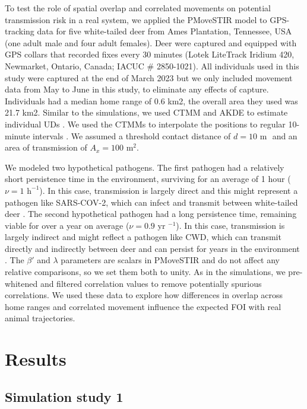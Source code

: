 ﻿\documentclass[11pt]{article}
\begin{document}
To test the role of spatial overlap and correlated movements on potential transmission risk in a real system, we applied the PMoveSTIR model to GPS-tracking data for five white-tailed deer from Ames Plantation, Tennessee, USA (one adult male and four adult females). 
Deer were captured and equipped with GPS collars that recorded fixes every 30 minutes (Lotek LiteTrack Iridium 420, Newmarket, Ontario, Canada; IACUC \# 2850-1021).  All individuals used in this study were captured at the end of March 2023 but we only included movement data from May to June in this study, to eliminate any effects of capture. Individuals had a median home range of 0.6 km2, the overall area they used was 21.7 km2.  Similar to the simulations, we used CTMM and AKDE to estimate individual UDs \citep{Calabrese2016}. We used the CTMMs to interpolate the positions to regular 10-minute intervals \citep{Yang2023}.  We assumed a threshold contact distance of $d = 10 \text{ m }$ and an area of transmission of $A_x = 100 \text{ m}^2$.

We modeled two hypothetical pathogens. The first pathogen had a relatively short persistence time in the environment, surviving for an average of 1 hour  ($\nu=1\text{ h}^{-1 }$). In this case, transmission is largely direct and this might represent a pathogen like SARS-COV-2, which can infect and transmit between white-tailed deer \citep{Hale2022}. The second hypothetical pathogen had a long persistence time, remaining viable for over a year on average ($\nu=0.9 \text{ yr }^{-1}$). In this case, transmission is largely indirect and might reflect a pathogen like CWD, which can transmit directly and indirectly between deer and can persist for years in the environment \citep{Saunders2012a}. The $\beta'$ and $\lambda$ parameters are scalars in PMoveSTIR and do not affect any relative comparisons, so we set them both to unity. As in the simulations, we pre-whitened and filtered correlation values to remove potentially spurious correlations. 
We used these data to explore how differences in overlap across home ranges and correlated movement influence the expected FOI with real animal trajectories.

\section*{Results}

\subsection*{Simulation study 1}
\end{document}
